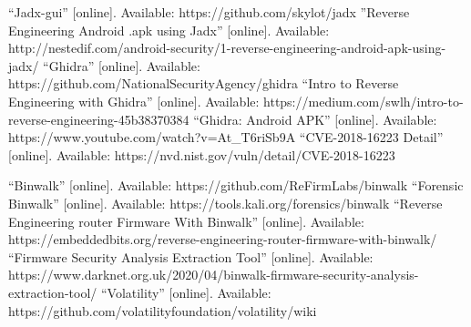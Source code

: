 \documentclass{easychair}
\begin{document}
\begin{thebibliography}{1}
“Jadx-gui” [online]. Available: https://github.com/skylot/jadx
”Reverse Engineering Android .apk using Jadx” [online]. Available:   http://nestedif.com/android-security/1-reverse-engineering-android-apk-using-jadx/
“Ghidra” [online]. Available:  https://github.com/NationalSecurityAgency/ghidra
“Intro to Reverse Engineering with Ghidra” [online]. Available:  https://medium.com/swlh/intro-to-reverse-engineering-45b38370384
“Ghidra: Android APK” [online]. Available:  https://www.youtube.com/watch?v=At\_T6riSb9A
“CVE-2018-16223 Detail” [online]. Available:  https://nvd.nist.gov/vuln/detail/CVE-2018-16223

“Binwalk” [online]. Available: https://github.com/ReFirmLabs/binwalk 
“Forensic Binwalk” [online]. Available: https://tools.kali.org/forensics/binwalk
“Reverse Engineering router Firmware With Binwalk” [online]. Available: https://embeddedbits.org/reverse-engineering-router-firmware-with-binwalk/
“Firmware Security Analysis Extraction Tool” [online]. Available: https://www.darknet.org.uk/2020/04/binwalk-firmware-security-analysis-extraction-tool/
“Volatility” [online]. Available: https://github.com/volatilityfoundation/volatility/wiki

\end{thebibliography}
\end{document}

